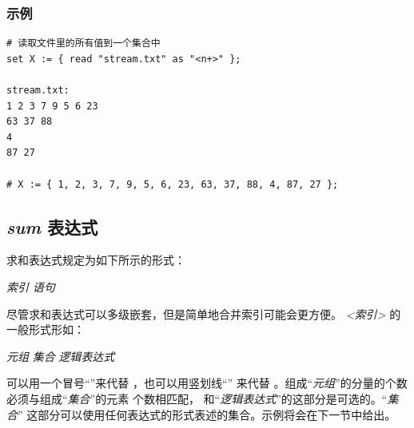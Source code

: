 \subsubsection{示例}%
{\small
\begin{verbatim}
# 读取文件里的所有值到一个集合中
set X := { read "stream.txt" as "<n+>" };

stream.txt:
1 2 3 7 9 5 6 23
63 37 88
4
87 27

# X := { 1, 2, 3, 7, 9, 5, 6, 23, 63, 37, 88, 4, 87, 27 };
\end{verbatim}
% 
% 
}

\subsection{\emph{sum} 表达式}
求和表达式规定为如下所示的形式：

\smallskip
{} \emph{索引}  \emph{语句}

\smallskip
\noindent 尽管求和表达式可以多级嵌套，但是简单地合并索引可能会更方便。
\emph{<索引>} 的一般形式形如：

\smallskip
\emph{元组}  \emph{集合}  \emph{逻辑表达式}

\smallskip
\noindent 可以用一个冒号“\code{:}”来代替 ，也可以用竖划线“\code{|}”
来代替 。组成“\emph{元组}”的分量的个数必须与组成“\emph{集合}”的元素
个数相匹配， 和“\emph{逻辑表达式}”的这部分是可选的。“\emph{集合}”
这部分可以使用任何表达式的形式表述的集合。示例将会在下一节中给出。

